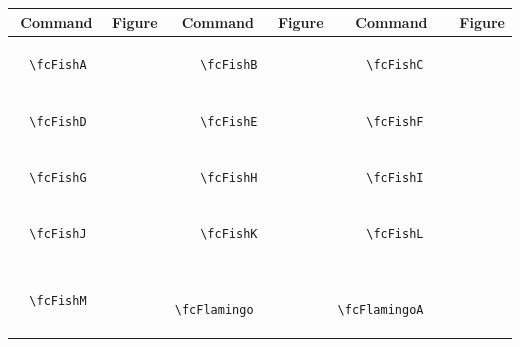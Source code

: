 \documentclass[x11names]{article}
\begin{document}
\begin{table}[H]\centering\begin{tabular}{|c|c|c|c|c|c|}\hline{\bf Command} & {\bf Figure} & {\bf Command} & {\bf Figure} & {\bf Command} & {\bf Figure}\\	\hline	&\multirow{5}{*}{	\fcFishA	[scale=0.64]} & &\multirow{5}{*}{	\fcFishB	[scale=0.36]} & &\multirow{5}{*}{	\fcFishC	[scale=0.36]}\\	& & & & & \\	& & & & & \\	\verb|	\fcFishA	| & & \verb|	\fcFishB	| & & \verb|	\fcFishC	| & \\	& & & & & \\	& & & & & \\	& & & & & \\	\hline									
		&\multirow{5}{*}{	\fcFishD	[scale=0.16]} & &\multirow{5}{*}{	\fcFishE	[scale=0.16]} & &\multirow{5}{*}{	\fcFishF	[scale=0.16]}\\	& & & & & \\	& & & & & \\	\verb|	\fcFishD	| & & \verb|	\fcFishE	| & & \verb|	\fcFishF	| & \\	& & & & & \\	& & & & & \\	& & & & & \\	\hline									
		&\multirow{5}{*}{	\fcFishG	[scale=0.16]} & &\multirow{5}{*}{	\fcFishH	[scale=0.16]} & &\multirow{5}{*}{	\fcFishI	[scale=0.16]}\\	& & & & & \\	& & & & & \\	\verb|	\fcFishG	| & & \verb|	\fcFishH	| & & \verb|	\fcFishI	| & \\	& & & & & \\	& & & & & \\	& & & & & \\	\hline									
		&\multirow{5}{*}{	\fcFishJ	[scale=0.16]} & &\multirow{5}{*}{	\fcFishK	[scale=0.16]} & &\multirow{5}{*}{	\fcFishL	[scale=0.16]}\\	& & & & & \\	& & & & & \\	\verb|	\fcFishJ	| & & \verb|	\fcFishK	| & & \verb|	\fcFishL	| & \\	& & & & & \\	& & & & & \\	& & & & & \\	\hline									
		&\multirow{5}{*}{	\fcFishM	[scale=0.16]} & &\multirow{5}{*}{	\fcFlamingo	[scale=0.64]} & &\multirow{5}{*}{	\fcFlamingoA	[scale=0.64]}\\	& & & & & \\	& & & & & \\	\verb|	\fcFishM	| & & \verb|	\fcFlamingo	| & & \verb|	\fcFlamingoA	| & \\	& & & & & \\	& & & & & \\	& & & & & \\	\hline									

\end{tabular}
\end{table}
\end{document}
